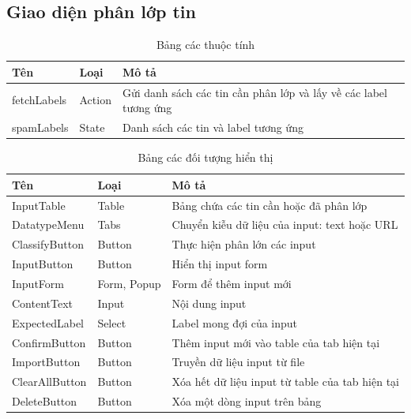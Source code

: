   \subsection{Giao diện phân lớp tin}
  \begin{table}[H]
    \centering
    \setlength{\tabcolstep}{12pt}
    \begin{tabular}{@{}lll@{}} \toprule
      Tên  & Loại   & Mô tả \\ \midrule
      fetchLabels &  Action   &  Gửi danh sách các tin cần phân lớp và lấy về các label tương ứng \\
      spamLabels  &  State  & Danh sách các tin và label tương ứng \\ \bottomrule
    \end{tabular}
    \caption{Bảng các thuộc tính}
  \end{table}

  \begin{table}[H]
    \centering
    \setlength{\tabcolstep}{12pt}
    \begin{tabular}{@{}lll@{}} \toprule
      Tên  & Loại   & Mô tả \\ \midrule
      InputTable   &  Table & Bảng chứa các tin cần hoặc đã phân lớp \\
      DatatypeMenu   & Tabs & Chuyển kiễu dữ liệu của input: text hoặc URL \\
      ClassifyButton  & Button  & Thực hiện phân lớn các input \\
      InputButton   & Button & Hiển thị input form \\
      InputForm   & Form, Popup & Form để thêm input mới \\
      ContentText & Input & Nội dung input \\
      ExpectedLabel & Select & Label mong đợi của input \\
      ConfirmButton & Button & Thêm input mới vào table của tab hiện tại \\
      ImportButton & Button & Truyền dữ liệu input từ file \\
      ClearAllButton & Button & Xóa hết dữ liệu input từ table của tab hiện tại \\
      DeleteButton & Button & Xóa một dòng input trên bảng \\ \bottomrule
    \end{tabular}
    \caption{Bảng các đối tượng hiển thị}
  \end{table}
